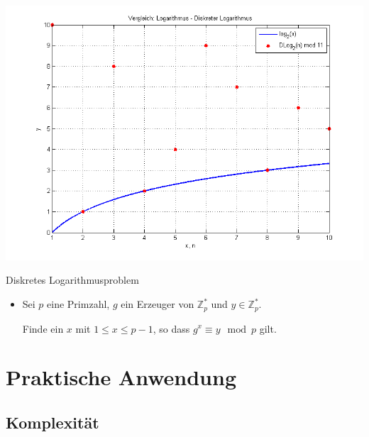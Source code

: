\documentclass[utf8]{beamer}
\newcommand{\Z}{\mathbb{Z}}
\begin{document}
\begin{frame}{\insertsubsectionhead}
  \begin{center}
    \includegraphics[width=\textwidth]{log_discLog.png}
  \end{center}
\end{frame}

\begin{frame}{Diskretes Logarithmusproblem}
  \begin{itemize}
    \item Sei $p$ eine Primzahl, $g$ ein Erzeuger von $\Z_p^*$ und $y \in
      \Z_p^*$.

      Finde ein $x$ mit $1 \leq x \leq p-1$, so dass $g^x \equiv y \mod
      p$ gilt.
  \end{itemize}
\end{frame}

\section{Praktische Anwendung}
\label{sec:praktische_anwendung}

\begin{frame}{\insertsectionhead}
  \tableofcontents[currentsection]
\end{frame}

\subsection{Komplexität}
\label{sub:komplexitat}
\end{document}
